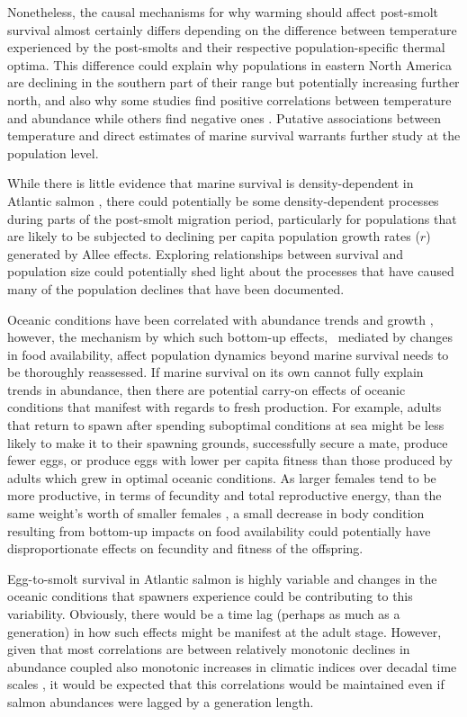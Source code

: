\documentclass[12pt]{article}
\begin{document}
Nonetheless, the causal mechanisms for why warming should affect post-smolt
survival almost certainly differs depending on the difference between
temperature experienced by the post-smolts and their respective
population-specific thermal optima. 
This difference could explain why populations in eastern North America are
declining in the southern part of their range but potentially increasing
further north, and also why some studies find positive correlations between
temperature and abundance \citep{Friedland1998, Friedland1998b, Jonsson2004}
while others find negative ones \citep{Friedland1993, Todd2008}.
Putative associations between temperature and direct estimates of marine
survival warrants further study at the population level.

While there is little evidence that marine survival is density-dependent in
Atlantic salmon \citep{Jonsson1998,Gibson2006}, there could potentially be
some density-dependent processes during parts of the post-smolt migration
period, particularly for populations that are likely to be subjected to
declining per capita population growth rates ($r$) generated by Allee effects.
Exploring relationships between survival and population size could potentially
shed light about the processes that have caused many of the population
declines that have been documented.

Oceanic conditions have been correlated with abundance trends and growth
\citep{Todd2008}, however, the mechanism by which such bottom-up effects, \
mediated by changes in food availability,
affect population dynamics beyond marine survival needs to
be thoroughly reassessed. If marine survival on its own cannot fully explain
trends in abundance, then there are potential carry-on effects of oceanic
conditions that manifest with regards to fresh production. 
For example, adults
that return to spawn after spending suboptimal conditions at sea might be less
likely to make it to their spawning grounds, successfully secure a mate,
produce fewer eggs, or produce eggs with lower per capita fitness than those
produced by adults which grew in optimal oceanic conditions.
As larger females tend to be more productive, in terms of fecundity and total
reproductive energy, than the same weight's worth of smaller females
\citep{Barneche2018}, a small decrease in body condition resulting from bottom-up
impacts on food availability could potentially have disproportionate effects on fecundity
and fitness of the offspring.

Egg-to-smolt survival in Atlantic salmon is highly variable \citep{Klemetsen2003,Chaput2015}
and changes in the oceanic conditions that spawners experience could be
contributing to this variability.
Obviously, there would be a time lag (perhaps as much as a generation) in how such effects
might be manifest at the adult stage.
However, given that most correlations are between relatively monotonic declines
in abundance coupled also monotonic increases in climatic indices
over decadal time scales \citep[e.g.,][]{Friedland1998, Todd2008,
    Beaugrand2012}, it would be expected that this correlations would be
maintained even if salmon abundances were lagged by a generation length.
\end{document}
